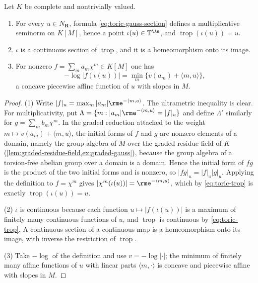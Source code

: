 \begin{lemma}
\label{lem:ch08-toric-gauss-section}
Let $K$ be complete and nontrivially valued.
\begin{enumerate}
\item For every $u\in N_{\mathbf R}$, formula
\eqref{eq:toric-gauss-section} defines a multiplicative seminorm on $K[M]$,
hence a point $\iota(u)\in\mathbb T^{\An}$, and
$\operatorname{trop}(\iota(u))=u$.
\item $\iota$ is a continuous section of $\operatorname{trop}$, and it is a
homeomorphism onto its image.
\item For nonzero $f=\sum_ma_m\chi^m\in K[M]$ one has
\begin{equation}
\label{eq:ch08-toric-trop-poly}
 -\log|f(\iota(u))|
   =\min_m\bigl\{v(a_m)+\langle m,u\rangle\bigr\} ,
\end{equation}
a concave piecewise affine function of $u$ with slopes in $M$.
\end{enumerate}
\end{lemma}

\begin{proof}
(1)  Write $|f|_u=\max_m|a_m|\rme^{-\langle m,u\rangle}$.  The ultrametric
inequality is clear.  For multiplicativity, put
$\Lambda=\{m:|a_m|\rme^{-\langle m,u\rangle}=|f|_u\}$ and define $\Lambda'$
similarly for $g=\sum_mb_m\chi^m$.  In the graded reduction attached to the
weight $m\mapsto v(a_m)+\langle m,u\rangle$, the initial forms of $f$ and
$g$ are nonzero elements of a domain, namely the group algebra of $M$ over
the graded residue field of $K$
(\cref{lem:graded-residue-field,ex:graded-gauss}), because the group algebra
of a torsion-free abelian group over a domain is a domain.  Hence the initial
form of $fg$ is the product of the two initial forms and is nonzero, so
$|fg|_u=|f|_u|g|_u$.  Applying the definition to $f=\chi^m$ gives
$|\chi^m(\iota(u))|=\rme^{-\langle m,u\rangle}$, which by
\eqref{eq:toric-trop} is exactly $\operatorname{trop}(\iota(u))=u$.

(2)  $\iota$ is continuous because each function
$u\mapsto|f(\iota(u))|$ is a maximum of finitely many continuous functions of
$u$, and $\operatorname{trop}$ is continuous by \eqref{eq:toric-trop}.  A
continuous section of a continuous map is a homeomorphism onto its image,
with inverse the restriction of $\operatorname{trop}$.

(3)  Take $-\log$ of the definition and use $v=-\log|\cdot|$; the minimum of
finitely many affine functions of $u$ with linear parts $\langle m,\cdot\rangle$
is concave and piecewise affine with slopes in $M$.
\end{proof}

